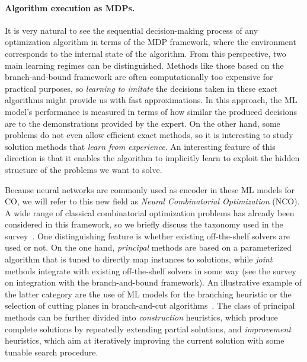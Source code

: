 \documentclass[a4paper]{report}
\theoremstyle{definition}
\theoremstyle{plain}
\begin{document}
\paragraph{Algorithm execution as MDPs.}
It is very natural to see the sequential decision-making process of any
optimization algorithm in terms of the MDP framework, where the environment
corresponds to the internal state of the algorithm. From this perspective, two
main learning regimes can be distinguished.
Methods like those based on the branch-and-bound framework are
often computationally too expensive for practical purposes, so \textit{learning
  to imitate} the decisions taken in these exact algorithms might provide us
with fast approximations. In this approach, the ML model's performance is
measured in terms of how similar the produced decisions are to the
demonstrations provided by the expert.
On the other hand, some problems do not even allow efficient exact methods, so it is
interesting to study solution methods that \textit{learn from experience}. An
interesting feature of this direction is that it enables the algorithm to implicitly
learn to exploit the hidden structure of the problems we want to solve.

Because neural networks are commonly used as encoder in these ML models for CO,
we will refer to this new field as \textit{Neural Combinatorial Optimization} (NCO).
%
A wide range of classical combinatorial optimization problems has already been
considered in this framework, so we briefly discuss the taxonomy used in the
survey~\cite{mazyavkinaReinforcementLearningCombinatorial2020}.
One distinguishing feature is whether existing off-the-shelf solvers are used or
not. On the one hand, \textit{principal} methods are based on a parameterized algorithm
that is tuned to directly map instances to solutions, while \textit{joint} methods
integrate with existing off-the-shelf solvers in some way (see the
survey~\cite{lodiLearningBranchingSurvey2017} on integration with the
branch-and-bound framework). An illustrative example of the latter category are
the use of ML models for the branching heuristic or the selection of cutting
planes in branch-and-cut algorithms~\cite{tangReinforcementLearningInteger2020}.
The class of principal methods can be further divided into \textit{construction}
heuristics, which produce complete solutions by repeatedly extending partial
solutions, and \textit{improvement} heuristics, which aim at iteratively improving the
current solution with some tunable search procedure.
\end{document}
